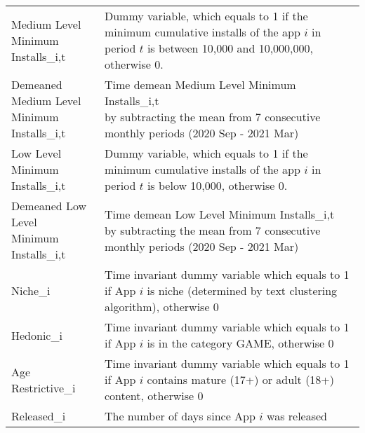 \begin{table}[h!]
\begin{tabular}{ll}
\makecell[l]{Medium Level \\ Minimum Installs_{i,t}}          &  \makecell[l]{Dummy variable, which equals to 1 if \\ the minimum cumulative installs of the app $i$ \\ in period $t$ is between 10,000 and 10,000,000, otherwise 0.} \\
\makecell[l]{Demeaned Medium Level \\ Minimum Installs_{i,t}} &  \makecell[l]{Time demean Medium Level Minimum Installs_{i,t} \\ by subtracting the mean from 7 consecutive \\ monthly periods (2020 Sep - 2021 Mar)} \\
\makecell[l]{Low Level \\ Minimum Installs_{i,t}}             &  \makecell[l]{Dummy variable, which equals to 1 if \\ the minimum cumulative installs of the app $i$ \\ in period $t$ is below 10,000, otherwise 0.} \\
\makecell[l]{Demeaned Low Level \\ Minimum Installs_{i,t}}    &  \makecell[l]{Time demean Low Level Minimum Installs_{i,t} \\ by subtracting the mean from 7 consecutive \\ monthly periods (2020 Sep - 2021 Mar)} \\
Niche_{i}                                                     &  \makecell[l]{Time invariant dummy variable which \\ equals to 1 if App $i$ is niche \\ (determined by text clustering algorithm), otherwise 0} \\
Hedonic_{i}                                                   &  \makecell[l]{Time invariant dummy variable which \\ equals to 1 if App $i$ is in the category GAME, otherwise 0} \\
Age Restrictive_{i}                                           &  \makecell[l]{Time invariant dummy variable which \\ equals to 1 if App $i$ contains mature (17+) \\ or adult (18+) content, otherwise 0} \\
Released_{i}                                                  &  \makecell[l]{The number of days \\ since App $i$ was released} \\

\end{tabular}
\end{table}
